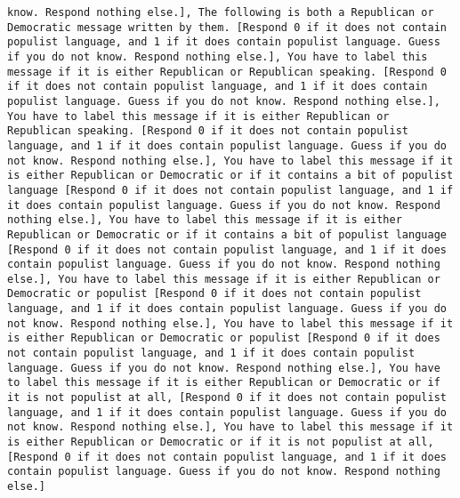 \begin{lstlisting}[label=lst:poor_performing_prompts]
know. Respond nothing else.], The following is both a Republican or Democratic message written by them. [Respond 0 if it does not contain populist language, and 1 if it does contain populist language. Guess if you do not know. Respond nothing else.], You have to label this message if it is either Republican or Republican speaking. [Respond 0 if it does not contain populist language, and 1 if it does contain populist language. Guess if you do not know. Respond nothing else.], You have to label this message if it is either Republican or Republican speaking. [Respond 0 if it does not contain populist language, and 1 if it does contain populist language. Guess if you do not know. Respond nothing else.], You have to label this message if it is either Republican or Democratic or if it contains a bit of populist language [Respond 0 if it does not contain populist language, and 1 if it does contain populist language. Guess if you do not know. Respond nothing else.], You have to label this message if it is either Republican or Democratic or if it contains a bit of populist language [Respond 0 if it does not contain populist language, and 1 if it does contain populist language. Guess if you do not know. Respond nothing else.], You have to label this message if it is either Republican or Democratic or populist [Respond 0 if it does not contain populist language, and 1 if it does contain populist language. Guess if you do not know. Respond nothing else.], You have to label this message if it is either Republican or Democratic or populist [Respond 0 if it does not contain populist language, and 1 if it does contain populist language. Guess if you do not know. Respond nothing else.], You have to label this message if it is either Republican or Democratic or if it is not populist at all, [Respond 0 if it does not contain populist language, and 1 if it does contain populist language. Guess if you do not know. Respond nothing else.], You have to label this message if it is either Republican or Democratic or if it is not populist at all, [Respond 0 if it does not contain populist language, and 1 if it does contain populist language. Guess if you do not know. Respond nothing else.]

\end{lstlisting}
